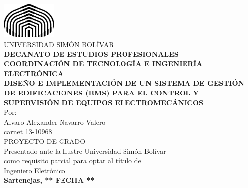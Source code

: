 \thispagestyle{empty}
\begin{center}
\includegraphics[width=0.20\textwidth]{Figuras/USB_logo.eps}\\ %
{\large UNIVERSIDAD SIMÓN BOLÍVAR}\\\textbf{DECANATO DE ESTUDIOS PROFESIONALES}\\\textbf{COORDINACIÓN DE TECNOLOGÍA E INGENIERÍA ELECTRÓNICA} %
\\[8\baselineskip]

\textbf{DISEÑO E IMPLEMENTACIÓN DE UN SISTEMA DE GESTIÓN DE EDIFICACIONES (BMS) PARA EL CONTROL Y SUPERVISIÓN DE EQUIPOS ELECTROMECÁNICOS}
\\[2\baselineskip]

Por:\\ Alvaro Alexander Navarro Valero \\ carnet 13-10968
\\[8\baselineskip]

PROYECTO DE GRADO\\Presentado ante la Ilustre Universidad Simón Bolívar\\como requisito parcial para optar al título de \\ Ingeniero Eletrónico
\\[2\baselineskip]

\textbf{Sartenejas, ** FECHA **}
\end{center}